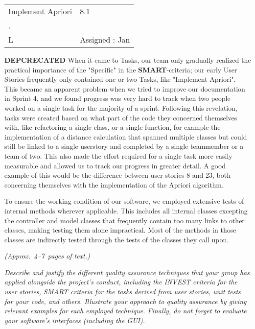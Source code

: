 \begin{table}
  \label{Example Task 1}
  \centering
	\begin{tabular}[h]{ |p{4cm} p{4cm}| }
	\hline
	Implement Apriori & 8.1 \\
	 . & \\
	 \hfill \break
	 L & Assigned : Jan 
	\end{tabular}
\end{table}

\newpage
\textbf{DEPCRECATED}
When it came to Tasks, our team only gradually realized the practical importance of the "Specific" in the \textbf{ SMART}-criteria; our early User Stories frequently only contained one or two Tasks, like "Implement Apriori". This became an apparent problem when we tried to improve our documentation in Sprint 4, and we found progress was very hard to track when two people worked on a single task for the majority of a sprint. 
Following this revelation, tasks were created based on what part of the code they concerned themselves with, like refactoring a single class, or a single function, for example the implementation of a distance calculation that spanned multiple classes but could still be linked to a single userstory and completed by a single teammember or a team of two. 
This also made the effort required for a single task more easily measurable and allowed us to track our progress in greater detail. A good example of this would be the difference between user stories 8 and 23, both concerning themselves with the implementation of the Apriori algorithm.

To ensure the working condition of our software, we employed extensive tests of internal methods wherever applicable. 
This includes all internal classes excepting the controller and model classes that frequently contain too many links to other classes, making testing them alone impractical. Most of the methods in those classes are indirectly tested through the tests of the classes they call upon. 


\emph{(Approx.~4--7~pages of text.)}

\emph{Describe and justify the different quality assurance techniques that your group has applied alongside the project's conduct, including the INVEST criteria for the user stories, SMART criteria for the tasks derived from user stories, unit tests for your code, and others.  Illustrate your approach to quality assurance by giving relevant examples for each employed technique. Finally, do not forget to evaluate your software's interfaces (including the GUI).}